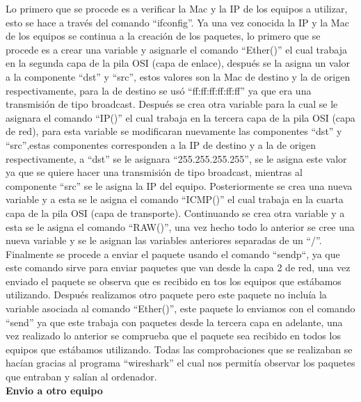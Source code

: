 \documentclass{udpreport}
\begin{document}
		Lo primero que se procede es a verificar la Mac y la IP de los  equipos a utilizar, esto se hace a través del comando “ifconfig”. Ya una vez conocida la IP y la Mac de los equipos se continua a la creación de los paquetes, lo primero que se procede es a crear una variable y asignarle el comando  “Ether()” el cual trabaja en la segunda capa de la pila OSI (capa de enlace), después se la asigna un valor a la componente “dst” y “src”, estos valores son la Mac de destino y la de origen respectivamente, para la de destino se usó “ff:ff:ff:ff:ff:ff” ya que era una transmisión de tipo broadcast. Después se crea otra variable para la cual se le asignara el comando “IP()” el cual trabaja en la tercera capa de la pila OSI (capa de red), para esta variable se modificaran nuevamente las componentes “dst” y “src”,estas componentes corresponden a la IP de destino y a la de origen respectivamente, a “dst” se le asignara “255.255.255.255”, se le asigna este valor ya que se quiere hacer una transmisión de tipo broadcast, mientras al componente “src” se le asigna la IP del equipo. Posteriormente se crea una nueva variable y a esta se le asigna el comando “ICMP()” el cual trabaja en la cuarta capa de la pila OSI (capa de transporte). Continuando se crea otra variable y a esta se le asigna el comando “RAW()”, una vez hecho todo lo anterior se cree una nueva variable y se le asignan las variables anteriores separadas de un “/”. Finalmente se procede a enviar el paquete usando el comando “sendp“, ya que este comando sirve para enviar paquetes que van desde la capa 2 de red, una vez enviado el paquete se observa que es recibido en tos los equipos que estábamos utilizando. Después realizamos otro paquete pero este paquete no incluía la variable asociada al comando “Ether()”, este paquete lo enviamos con el comando “send” ya que este trabaja con paquetes desde la tercera capa en adelante, una vez realizado lo anterior se comprueba que el paquete sea recibido en todos los equipos que estábamos utilizando. Todas las comprobaciones que se realizaban se hacían gracias al programa “wireshark” el cual nos permitía observar los paquetes que entraban y salían al ordenador.\\
		{\bf Envio a otro equipo}\\
\end{document}
